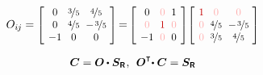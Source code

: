\begin{tcolorbox}
\begin{equation*}
O_{i\hspace{-0.1ex}j} =
\scalebox{.92}[.92]{$\left[\hspace{-0.2ex}\begin{array}{c@{\hspace{.6em}}c@{\hspace{.6em}}c}
0 & \nicefrac{3}{5} & \nicefrac{4}{5} \\
0 & \nicefrac{4}{5} & - \hspace{.2ex} \nicefrac{3}{5} \\
-1 & 0 & 0
\end{array}\hspace{-0.4ex}\right]$}
\hspace{-0.25ex} = \hspace{-0.25ex}
\scalebox{0.92}[0.92]{$\left[\hspace{-0.2ex}\begin{array}{c@{\hspace{.6em}}c@{\hspace{.6em}}c}
0 & \mathcolor{red!33!white}{0} & 1 \\
\mathcolor{red!33!white}{0} & \mathcolor{red!77!black}{1} & \mathcolor{red!33!white}{0} \\
-1 & \mathcolor{red!33!white}{0} & 0
\end{array}\hspace{-0.2ex}\right]$}
\scalebox{0.92}[0.92]{$\left[\hspace{-0.2ex}\begin{array}{c@{\hspace{.6em}}c@{\hspace{.6em}}c}
\mathcolor{red!77!black}{1} & \mathcolor{red!33!white}{0} & \mathcolor{red!33!white}{0} \\
\mathcolor{red!33!white}{0} & \nicefrac{4}{5} & - \hspace{.2ex} \nicefrac{3}{5} \\
\mathcolor{red!33!white}{0} & \nicefrac{3}{5} & \nicefrac{4}{5}
\end{array}\hspace{-0.4ex}\right]$}
\end{equation*}

\begin{equation*}\begin{array}{c}
\bm{C} = \rotationtensor \hspace{-0.1ex} \dotp \bm{S_{\smash{\mathsf{R}}}}
\hspace{.1ex} , \:\:
\rotationtensor^{\T}\hspace{-0.5ex} \dotp \bm{C} = \bm{S_{\smash{\mathsf{R}}}}
\end{array}\end{equation*}


\end{tcolorbox}
